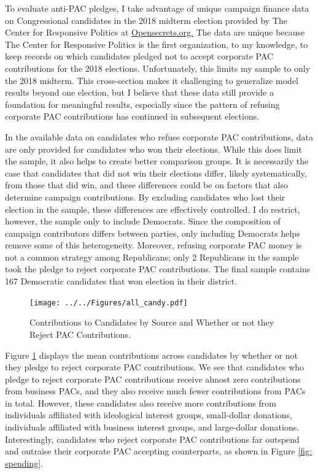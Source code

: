 \documentclass[12pt]{article}
\begin{document}
To evaluate anti-PAC pledges, I take advantage of unique campaign finance data on Congressional candidates in the 2018 midterm election provided by The Center for Responsive Politics at \href{https://www.opensecrets.org}{Opensecrets.org.} The data are unique because The Center for Responsive Politics is the first organization, to my knowledge, to keep records on which candidates pledged not to accept corporate PAC contributions for the 2018 elections. Unfortunately, this limits my sample to only the 2018 midterm. This cross-section makes it challenging to generalize model results beyond one election, but I believe that these data still provide a foundation for meaningful results, especially since the pattern of refusing corporate PAC contributions has continued in subsequent elections.    

In the available data on candidates who refuse corporate PAC contributions, data are only provided for candidates who won their elections. While this does limit the sample, it also helps to create better comparison groups. It is necessarily the case that candidates that did not win their elections differ, likely systematically, from those that did win, and these differences could be on factors that also determine campaign contributions. By excluding candidates who lost their election in the sample, these differences are effectively controlled. I do restrict, however, the sample only to include Democrats. Since the composition of campaign contributors differs between parties, only including Democrats helps remove some of this heterogeneity. Moreover, refusing corporate PAC money is not a common strategy among Republicans; only 2 Republicans in the sample took the pledge to reject corporate PAC contributions. The final sample contains 167 Democratic candidates that won election in their district. 

\begin{figure}[!htb]
    \centering
    \texttt{[image: ../../Figures/all\_candy.pdf]}
    \caption{Contributions to Candidates by Source and Whether or not they Reject PAC Contributions.}
    \label{fig: all contribs}
\end{figure}

Figure \ref{fig: all contribs} displays the mean contributions across candidates by whether or not they pledge to reject corporate PAC contributions. We see that candidates who pledge to reject corporate PAC contributions receive almost zero contributions from business PACs, and they also receive much fewer contributions from PACs in total. However, these candidates also receive more contributions from individuals affiliated with ideological interest groups, small-dollar donations, individuals affiliated with business interest groups, and large-dollar donations. Interestingly, candidates who reject corporate PAC contributions far outspend and outraise their corporate PAC accepting counterparts, as shown in Figure \ref{fig: spending}.
\end{document}

